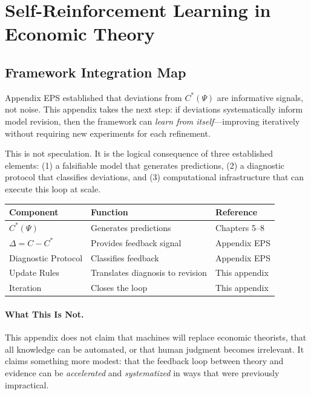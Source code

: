 \section{Self-Reinforcement Learning in Economic Theory}
\label{app:self-reinforcement}

\subsection{Framework Integration Map}

Appendix EPS established that deviations from $C^*(\Psi)$ are informative signals, 
not noise. This appendix takes the next step: if deviations systematically 
inform model revision, then the framework can \emph{learn from itself}---improving 
iteratively without requiring new experiments for each refinement.

This is not speculation. It is the logical consequence of three established 
elements: (1) a falsifiable model that generates predictions, (2) a diagnostic 
protocol that classifies deviations, and (3) computational infrastructure that 
can execute this loop at scale.

\begin{center}
\renewcommand{\arraystretch}{1.4}
\begin{tabular}{|l|l|l|}
\hline
\textbf{Component} & \textbf{Function} & \textbf{Reference} \\
\hline
$C^*(\Psi)$ & Generates predictions & Chapters 5--8 \\
$\Delta = C - C^*$ & Provides feedback signal & Appendix EPS \\
Diagnostic Protocol & Classifies feedback & Appendix EPS \\
Update Rules & Translates diagnosis to revision & This appendix \\
Iteration & Closes the loop & This appendix \\
\hline
\end{tabular}
\end{center}

\paragraph{What This Is Not.}
This appendix does not claim that machines will replace economic theorists, 
that all knowledge can be automated, or that human judgment becomes irrelevant. 
It claims something more modest: that the feedback loop between theory and 
evidence can be \emph{accelerated} and \emph{systematized} in ways that were 
previously impractical.

